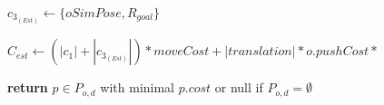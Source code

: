 \begin{algorithm}[H]
\begin{algorithmic}[1]
          \State $c_{3_{(Est)}} \gets \{oSimPose, R_{goal}\}$

          \State $C_{est} \gets (|c_{1}| + |c_{3_{(Est)}}|) * moveCost + |translation| * o.pushCost *$ 

        \EndWhile

      \EndFor

    \State \textbf{return} $p \in P_{o,d}$ with minimal $p.cost$ or null if $P_{o,d} = \emptyset$

    \EndProcedure

  \end{algorithmic}
\end{algorithm}

